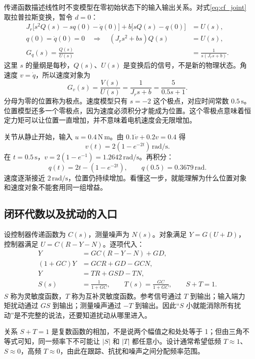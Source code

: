 传递函数描述线性时不变模型在零初始状态下的输入输出关系。对式\eqref{eq:cf_joint}取拉普拉斯变换，暂令 $d=0$：
\begin{align}
J_r\big[s^2Q(s)-s q(0)-\dot q(0)\big]
+b\big[sQ(s)-q(0)\big]&=U(s),\\
q(0)=\dot q(0)=0\quad\Longrightarrow\quad
(J_rs^2+bs)Q(s)&=U(s),\\
G_q(s)=\frac{Q(s)}{U(s)}&=\frac{1}{s(J_rs+b)}.
\end{align}
这里 $s$ 的量纲是每秒，$Q(s)$、$U(s)$ 是变换后的信号，不是新的物理状态。角速度 $v=\dot q$，所以速度对象为
\begin{equation}
G_v(s)=\frac{V(s)}{U(s)}=\frac{1}{J_rs+b}
=\frac{5}{0.5s+1}.
\end{equation}
分母为零的位置称为极点。速度模型只有 $s=-2$ 这个极点，对应时间常数 $0.5\,\mathrm{s}$。位置模型还多一个零极点，因为速度必须积分才能成为位置。这个零极点意味着恒定力矩可以让位置一直增加，并不意味着电机速度会无限增加。

\begin{examplebox}[算例 11A 恒定力矩产生怎样的运动]
关节从静止开始，输入 $u=0.4\,\mathrm{N\,m}$。由 $0.1\dot v+0.2v=0.4$ 得
\[
v(t)=2(1-e^{-2t})\,\mathrm{rad/s}.
\]
在 $t=0.5\,\mathrm{s}$，$v=2(1-e^{-1})=1.2642\,\mathrm{rad/s}$。再积分：
\[
q(t)=2t-(1-e^{-2t}),\qquad q(0.5)=0.3679\,\mathrm{rad}.
\]
速度逐渐接近 $2\,\mathrm{rad/s}$，位置仍持续增加。看懂这一步，就能理解为什么位置对象和速度对象不能套用同一组增益。
\end{examplebox}

\subsection{闭环代数以及扰动的入口}

设控制器传递函数为 $C(s)$，测量噪声为 $N(s)$。对象满足 $Y=G(U+D)$，控制器满足 $U=C(R-Y-N)$。逐项代入：
\begin{align}
Y&=GC(R-Y-N)+GD,\\
(1+GC)Y&=GCR+GD-GCN,\\
Y&=T R+G S D-TN,\\
S(s)&=\frac{1}{1+GC},\qquad
T(s)=\frac{GC}{1+GC},\qquad S+T=1.
\end{align}
$S$ 称为灵敏度函数，$T$ 称为互补灵敏度函数。参考信号通过 $T$ 到输出；输入端力矩扰动通过 $GS$ 到输出；测量噪声通过 $-T$ 到输出。因此“$S$ 小就能消除所有扰动”是不完整的说法，还要知道扰动从哪里进入。

关系 $S+T=1$ 是复数函数的相加，不是说两个幅值之和处处等于 1；但由三角不等式可知，同一频率下不可能让 $|S|$ 和 $|T|$ 都任意小。设计通常希望低频 $T\approx1$、$S\approx0$，高频 $T\approx0$，由此在跟踪、抗扰和噪声之间分配频率范围。

